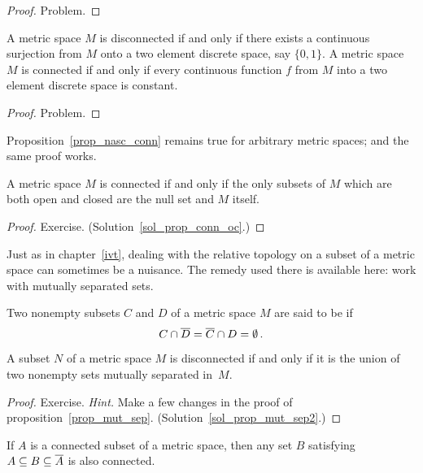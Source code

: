 \begin{proof} Problem.  \ns  \end{proof}

\begin{prop}\label{prop_dconn_2ptimg} A metric space $M$ is disconnected if and only if there
exists a continuous surjection from $M$ onto a two element discrete space, say $\{0,1\}$.  A
metric space $M$ is connected if and only if every continuous function $f$ from $M$ into a two
element discrete space is constant.
\end{prop}

\begin{proof} Problem.  \ns  \end{proof}

Proposition~\ref{prop_nasc_conn} remains true for arbitrary metric spaces; and the same proof
works.

\begin{prop}\label{prop_conn_oc} A metric space $M$ is connected
if and only if the only subsets of $M$ which are both open and
closed are the null set and $M$ itself.
\end{prop}

\begin{proof} Exercise.  (Solution~\ref{sol_prop_conn_oc}.)    \ns  \end{proof}

Just as in chapter~\ref{ivt}, dealing with the relative topology on a subset of a metric space
can sometimes be a nuisance.  The remedy used there is available here: work with mutually
separated sets.

\begin{defn} Two nonempty subsets $C$ and $D$ of a metric space $M$ are said to be
 if
  \[ C \cap \overline{D} = \overline{C} \cap D = \emptyset\,. \]
\end{defn}

\begin{prop}\label{prop_mut_sep2} A subset $N$ of a metric space $M$ is disconnected if and
only if it is the union of two nonempty sets mutually separated in~$M$.
\end{prop}

\begin{proof} Exercise.  \emph{Hint.}  Make a few changes in the
proof of proposition~\ref{prop_mut_sep}.    (Solution~\ref{sol_prop_mut_sep2}.)  \ns
\end{proof}

\begin{prop}\label{prop_clconn_conn} If $A$ is a connected subset of a metric space, then any
set $B$ satisfying $A \subseteq B \subseteq \overline{A}$ is also connected.
\end{prop}

